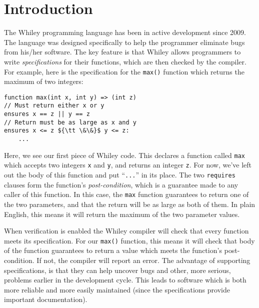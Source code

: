 \section{Introduction}
The Whiley programming language has been in active development since
2009.  The language was designed specifically to help the programmer
eliminate bugs from his/her software.  The key feature is that Whiley
allows programmers to write {\em specifications} for their functions,
which are then checked by the compiler.  For example, here is the
specification for the \lstinline{max()} function which returns the
maximum of two integers:

\begin{lstlisting}
function max(int x, int y) => (int z)
// Must return either x or y
ensures x == z || y == z
// Return must be as large as x and y
ensures x <= z ${\tt \&\&}$ y <= z:
    ...
\end{lstlisting}
Here, we see our first piece of Whiley code.  This declares a function
called \lstinline{max} which accepts two integers \lstinline{x} and
\lstinline{y}, and returns an integer \lstinline{z}.  For now, we've
left out the body of this function and put ``\lstinline{...}'' in its
place.  The two \lstinline{requires} clauses form the function's {\em
  post-condition}, which is a guarantee made to any caller of this
function.  In this case, the \lstinline{max} function guarantees to
return one of the two parameters, and that the return will be as large
as both of them.  In plain English, this means it will return the
maximum of the two parameter values.  

When verification is enabled the Whiley compiler will check that every
function meets its specification.  For our \lstinline{max()} function,
this means it will check that body of the function guarantees to
return a value which meets the function's post-condition.  If not, the
compiler will report an error.  The advantage of supporting
specifications, is that they can help uncover bugs and other, more
serious, problems earlier in the development cycle.  This leads to
software which is both more reliable and more easily maintained (since
the specifications provide important documentation).

